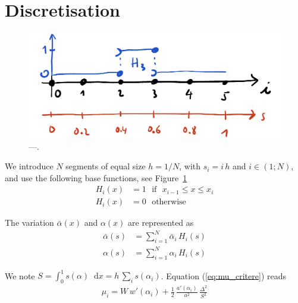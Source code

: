\documentclass[final,3p,times,authoryear]{elsarticle}
\renewcommand*\d{\mathop{}\!\mathrm{d}} %
\begin{document}
%
%
%
%
%
%
%
\section{Discretisation} \label{sec:going_discrete}
%
%
%
%
%
%
%
\begin{figure}[htb]
\centering
\includegraphics[width=0.95 \columnwidth]{base_functions}
\caption{\label{fig:base_functions}
---.}
\end{figure}
We introduce $N$ segments of equal size $h=1/N$, with $s_i=i \, h$ and $i \in (1;N)$, and use the following base functions, see Figure~\ref{fig:base_functions}
\begin{subequations}
 \label{eq:base_func}
\begin{align}
H_i(x) &= 1 \text{~ if ~} x_{i-1} \le x \le x_i  \\
H_i(x) &= 0 \text{~ otherwise ~}
\end{align}
\end{subequations}

The variation $\bar{\alpha}(x)$ and $\alpha(x)$ are represented as
\begin{subequations}
\label{eq:discrete_variations}
\begin{align}
\bar{\alpha}(s) &= \sum_{i=1}^N \bar{\alpha}_i \, H_i(s) \label{eq:19a} \\
\alpha(s) &= \sum_{i=1}^N \alpha_i \, H_i(s) \label{eq:19b}
\end{align}
\end{subequations}



We note $S=\int_0^1 s(\alpha) \d x = h \, \sum_i s(\alpha_i)$. 
Equation (\ref{eq:mu_critere}) reads 
\begin{align}
\mu_i=
W \, w'(\alpha_i) + \frac12 \, \frac{a'(\alpha_i)}{a^2 } \, \frac{\Delta^2}{S^2} \label{eq:mu_critere_discrete}
\end{align}
\end{document}
